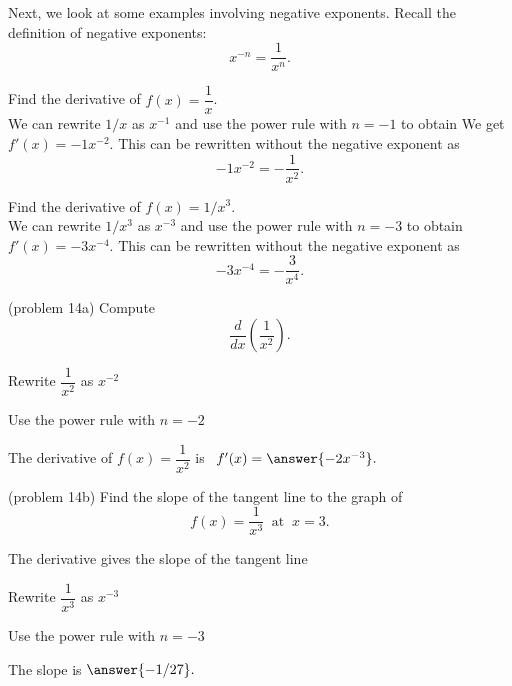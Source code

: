 \documentclass{ximera}
\begin{document}
Next, we look at some examples involving negative exponents. Recall the definition of negative exponents:
\[
x^{-n} = \frac{1}{x^n}.
\]



\begin{example}[example 13]
Find the derivative of $f(x) = \dfrac{1}{x}$.\\
We can rewrite $1/x$ as $x^{-1}$ and use the power rule with $n = -1$ to obtain 
We get $f'(x) = -1x^{-2}$.
This can be rewritten without the negative exponent as
\[ 
-1x^{-2} = -\frac{1}{x^2}.
\]
\end{example}



\begin{example}[example 14]
Find the derivative of $f(x) = 1/x^3$.\\
We can rewrite $1/x^3$ as $x^{-3}$ and use the power rule with $n = -3$ to obtain 
$f'(x) = -3x^{-4}$.
This can be rewritten without the negative exponent as
\[
-3x^{-4} = -\frac{3}{x^4}.
\]
\end{example}




\begin{problem}(problem 14a)
Compute
\[
\frac{d}{dx} \left(\frac{1}{x^2}\right).
\]
\begin{hint}
Rewrite $\dfrac{1}{x^2}$ as $x^{-2}$
\end{hint}
\begin{hint}
Use the power rule with $n = -2$
\end{hint}
The derivative of $f(x) = \dfrac{1}{x^2}$ is \ $f'(x) = \answer{-2x^{-3}}.$
\end{problem}




\begin{problem}(problem 14b)
Find the slope of the tangent line to the graph of 
\[
f(x) = \frac{1}{x^3} \;\; \text{at} \;\; x = 3.
\]


\begin{hint}
The derivative gives the slope of the tangent line
\end{hint}
\begin{hint}
Rewrite $\dfrac{1}{x^3}$ as $x^{-3}$
\end{hint}
\begin{hint}
Use the power rule with $n = -3$
\end{hint}
The slope is  $\answer{-1/27}.$
\end{problem}
\end{document}
